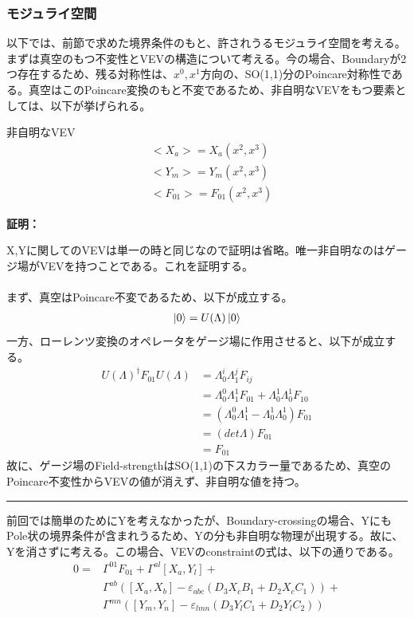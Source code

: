 \documentclass[dvipdfmx,a4paper,10.5pt]{article}
\numberwithin{equation}{section}
\newenvironment{proofbox}
{\begin{prooflabel}\textbf{証明：}\end{prooflabel}\vspace{0.8em}}
{\par\vspace{1em}\hrule\vspace{1em}}
\begin{document}
\subsubsection{モジュライ空間}
以下では、前節で求めた境界条件のもと、許されうるモジュライ空間を考える。\\
まずは真空のもつ不変性とVEVの構造について考える。今の場合、Boundaryが2つ存在するため、残る対称性は、$x^{0},x^{1}$方向の、SO(1,1)分のPoincare対称性である。真空はこのPoincare変換のもと不変であるため、非自明なVEVをもつ要素としては、以下が挙げられる。
\begin{resultbox}{非自明なVEV}
    \begin{align*}
        &<X_{a}>=X_{a}(x^{2},x^{3})\\
        &<Y_{m}>=Y_{m}(x^{2},x^{3})\\
        &<F_{01}>=F_{01}(x^{2},x^{3})
    \end{align*}
\end{resultbox}
\begin{proofbox}
    X,Yに関してのVEVは単一の時と同じなので証明は省略。唯一非自明なのはゲージ場がVEVを持つことである。これを証明する。\\
    \\
    まず、真空はPoincare不変であるため、以下が成立する。
    \begin{align*}
        \ket{0}=U(\Lambda)\ket{0}
    \end{align*}
    一方、ローレンツ変換のオペレータをゲージ場に作用させると、以下が成立する。
    \begin{align*}
        U(\Lambda)^{\dagger}F_{01}U(\Lambda)&=\Lambda_{0}^{i}\Lambda_{1}^{j}F_{ij}\\
        &=\Lambda_{0}^{0}\Lambda_{1}^{1}F_{01}+\Lambda_{0}^{1}\Lambda_{0}^{1}F_{10}\\
        &=(\Lambda_{0}^{0}\Lambda_{1}^{1}-\Lambda_{0}^{1}\Lambda_{0}^{1})F_{01}\\
        &=(det\Lambda)F_{01}\\
        &=F_{01}
    \end{align*}
    故に、ゲージ場のField-strengthはSO(1,1)の下スカラー量であるため、真空のPoincare不変性からVEVの値が消えず、非自明な値を持つ。
\end{proofbox}
前回では簡単のためにYを考えなかったが、Boundary-crossingの場合、YにもPole状の境界条件が含まれうるため、Yの分も非自明な物理が出現する。故に、Yを消さずに考える。この場合、VEVのconstraintの式は、以下の通りである。
\begin{align*}
    0=&\Gamma^{01}F_{01}+\Gamma^{al}[X_{a},Y_{l}]+\\
    &\Gamma^{ab}([X_{a},X_{b}]-\varepsilon_{abc}(D_{3}X_{c}B_{1}+D_{2}X_{c}C_{1}))+\\
    &\Gamma^{mn}([Y_{m},Y_{n}]-\varepsilon_{lmn}(D_{3}Y_{l}C_{1}+D_{2}Y_{l}C_{2}))
\end{align*}
\end{document}
